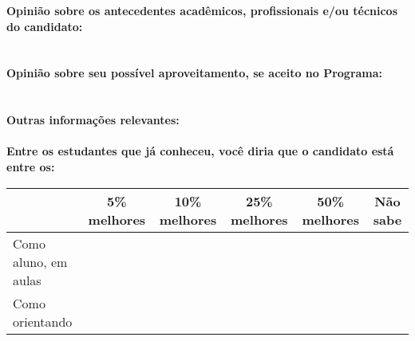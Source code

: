 \documentclass[11pt]{article}
\begin{document}
\textbf{Opinião sobre os antecedentes acadêmicos, profissionais e/ou técnicos do candidato:}
\\\\
\\
\textbf{Opinião sobre seu possível aproveitamento, se aceito no Programa:}
\\\\ 
\\
\textbf{Outras informações relevantes:} \\
\\[0.3cm]
\textbf{Entre os estudantes que já conheceu, você diria que o candidato está entre os:}
\\
\begin{tabular}{|l|c|c|c|c|c|}
\hline
 & 5\% melhores & 10\% melhores & 25\% melhores & 50\% melhores & Não sabe \\
\hline
Como aluno, em aulas &  &  &  &  & \\
\hline
Como orientando &  &  &  &  & \\
\hline
\end{tabular}
\end{document}
